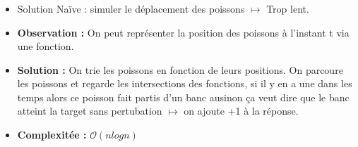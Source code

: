 \begin{frame}
    \frametitle{\problemtitle}
    \begin{itemize}
        \begin{block}{Problème}
            On a des poissons qui ont certain position et une vitesse, calculez le nombre de bancs
        \end{block}
        \item<+-> Solution Naïve : simuler le déplacement des poissons $\mapsto$ Trop lent.
        \item<+-> \textbf{Observation :} On peut représenter la position des poissons à l'instant t via une fonction. 
        \item<+-> \textbf{Solution :} On trie les poissons en fonction de leurs positions. On parcoure les poissons et regarde les intersections des fonctions, si il y en a une dans les temps alors ce poisson fait partis d'un banc ausinon ça veut dire que le banc atteint la target sans pertubation $\mapsto$ on ajoute +1 à la réponse. 
        \item<+-> \textbf{Complexitée :} $\mathcal{O}(n log n)$

    \end{itemize}
    \solvestats
\end{frame}
